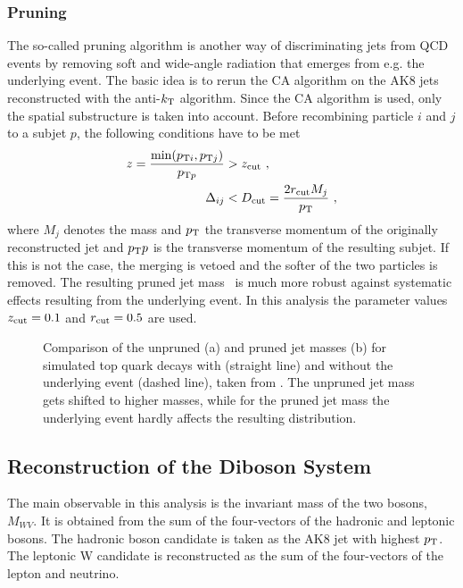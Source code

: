 \subsubsection*{Pruning}
The so-called pruning algorithm \cite{pruning} is another way of discriminating jets from QCD events by removing soft and wide-angle radiation that emerges from e.g. the underlying event. The basic idea is to rerun the CA algorithm on the AK8 jets reconstructed with the anti-$k_{\rm T}$ algorithm. Since the CA algorithm is used, only the spatial substructure is taken into account.  Before recombining particle $i$ and $j$ to a subjet $p$, the following conditions have to be met
\begin{align}
z = \frac{\min (p_{{\rm T}i},p_{{\rm T}j})}{p_{{\rm T}p}} &> z_{\rm cut} ~, \\
\Delta_{ij} &< D_{\rm cut} = \frac{2r_{\rm cut}M_j}{p_{\rm T}} ~,
\end{align}
where $M_j$ denotes the mass and $p_{\rm T}$ the transverse momentum of the originally reconstructed jet and $p_{{\rm T}}p$ is the transverse momentum of the resulting subjet. If this is not the case, the merging is vetoed and the softer of the two particles is removed. The resulting pruned jet mass \Mpr \ is much more robust against systematic effects resulting from the underlying event. In this analysis the parameter values $z_{\rm cut}=0.1$ and $r_{\rm cut}=0.5$ are used.
\begin{figure}
	\centering
	\caption[Comparison of the pruned and unpruned jet masses for simulated top quark decays with and without the underlying event]{Comparison of the unpruned (a) and pruned jet masses (b) for simulated top quark decays with (straight line) and without the underlying event (dashed line), taken from \cite{pruning}. The unpruned jet mass gets shifted to higher masses, while for the pruned jet mass the underlying event hardly affects the resulting distribution.}
	\label{fig:reco:pruning}
\end{figure}
\subsection{Reconstruction of the Diboson System}
The main observable in this analysis is the invariant mass of the two bosons, $M_{WV}$. It is obtained from the sum of the four-vectors of the hadronic and leptonic bosons. The hadronic boson candidate is taken as the AK8 jet with highest $p_{\rm T}$. The leptonic W candidate is reconstructed as the sum of the four-vectors of the lepton and neutrino. 

